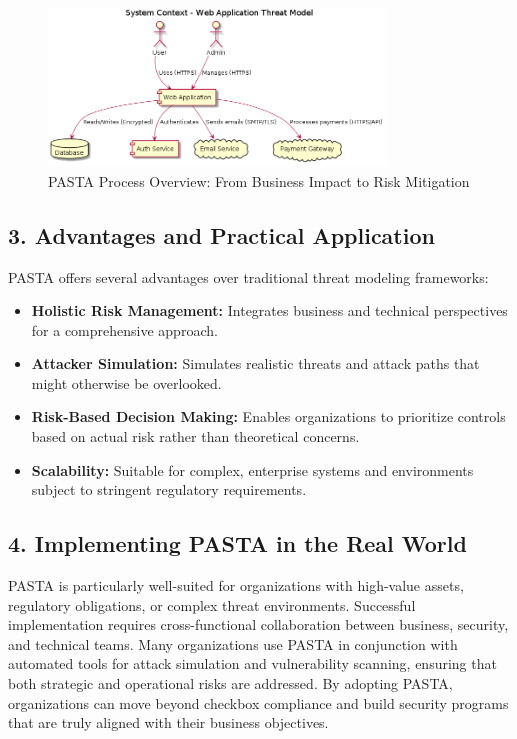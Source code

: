 \begin{figure}[H]
	\centering
	\includegraphics[width=0.8\textwidth]{images/system-context}
	\caption{PASTA Process Overview: From Business Impact to Risk Mitigation}
\end{figure}

\subsection*{3. Advantages and Practical Application}
PASTA offers several advantages over traditional threat modeling frameworks:
\begin{itemize}
	\item \textbf{Holistic Risk Management:} Integrates business and technical perspectives for a comprehensive approach.
	\item \textbf{Attacker Simulation:} Simulates realistic threats and attack paths that might otherwise be overlooked.
	\item \textbf{Risk-Based Decision Making:} Enables organizations to prioritize controls based on actual risk rather than theoretical concerns.
	\item \textbf{Scalability:} Suitable for complex, enterprise systems and environments subject to stringent regulatory requirements\cite{uceda2015}.
\end{itemize}

\subsection*{4. Implementing PASTA in the Real World}
PASTA is particularly well-suited for organizations with high-value assets, regulatory obligations, or complex threat environments. Successful implementation requires cross-functional collaboration between business, security, and technical teams. Many organizations use PASTA in conjunction with automated tools for attack simulation and vulnerability scanning, ensuring that both strategic and operational risks are addressed\cite{uceda2015,owasp}. By adopting PASTA, organizations can move beyond checkbox compliance and build security programs that are truly aligned with their business objectives.

